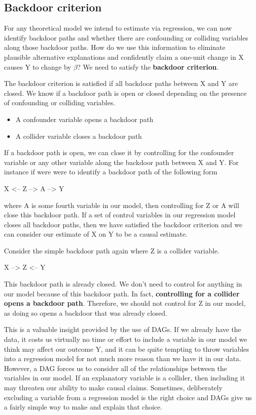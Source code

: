 \documentclass[
]{book}
\providecommand{\tightlist}{%
  \setlength{\itemsep}{0pt}\setlength{\parskip}{0pt}}
\begin{document}
\hypertarget{backdoor-criterion}{%
\subsection{Backdoor criterion}\label{backdoor-criterion}}

For any theoretical model we intend to estimate via regression, we can now identify backdoor paths and whether there are confounding or colliding variables along those backdoor paths. How do we use this information to eliminate plausible alternative explanations and confidently claim a one-unit change in X causes Y to change by \(\beta\)? We need to satisfy the \textbf{backdoor criterion}.

The backdoor criterion is satisfied if all backdoor paths between X and Y are closed. We know if a backdoor path is open or closed depending on the presence of confounding or colliding variables.

\begin{itemize}
\tightlist
\item
  A confounder variable opens a backdoor path
\item
  A collider variable closes a backdoor path
\end{itemize}

If a backdoor path is open, we can close it by controlling for the confounder variable or any other variable along the backdoor path between X and Y. For instance if were were to identify a backdoor path of the following form

X \textless-- Z --\textgreater{} A --\textgreater{} Y

where A is some fourth variable in our model, then controlling for Z or A will close this backdoor path. If a set of control variables in our regression model closes all backdoor paths, then we have satisfied the backdoor criterion and we can consider our estimate of X on Y to be a causal estimate.

Consider the simple backdoor path again where Z is a collider variable.

X --\textgreater{} Z \textless-- Y

This backdoor path is already closed. We don't need to control for anything in our model because of this backdoor path. In fact, \textbf{controlling for a collider opens a backdoor path}. Therefore, we should not control for Z in our model, as doing so opens a backdoor that was already closed.

This is a valuable insight provided by the use of DAGs. If we already have the data, it costs us virtually no time or effort to include a variable in our model we think may affect our outcome Y, and it can be quite tempting to throw variables into a regression model for not much more reason than we have it in our data. However, a DAG forces us to consider all of the relationships between the variables in our model. If an explanatory variable is a collider, then including it may threaten our ability to make causal claims. Sometimes, deliberately excluding a variable from a regression model is the right choice and DAGs give us a fairly simple way to make and explain that choice.
\end{document}
